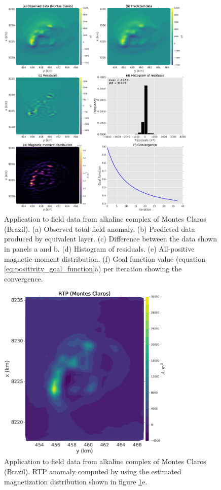 \begin{figure}
	\centering
	\includegraphics[width=0.85\textwidth]{Fig/field_data_montes_claros/montes_claros_compiled_LM_NNLS_magRM.eps}
	\caption{Application to field data from alkaline complex of Montes Claros (Brazil). (a) Observed total-field anomaly. (b) Predicted data produced by equivalent layer. (c) Difference between the data shown in panels a and b. (d) Histogram of residuals. (e) All-positive magnetic-moment distribution. (f) Goal function value (equation \ref{eq:positivity_goal_function}a) per iteration showing the convergence.}
	\label{fig:mc_data_application}
\end{figure}

\begin{figure}
	\centering
	\includegraphics[width=0.75\textwidth]{Fig/field_data_montes_claros/RTP_data_montes_claros.eps}
	\caption{Application to field data from alkaline complex of Montes Claros (Brazil). RTP anomaly computed by using the estimated magnetization distribution shown in figure \ref{fig:mc_data_application}e.}
	\label{fig:rtp_mc_data}
\end{figure}

